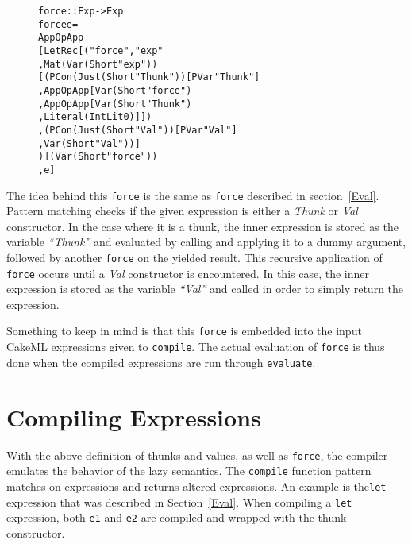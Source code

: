 \begin{figure}[H]
\begin{alltt}
force :: Exp -> Exp
force e =
  App OpApp
    [LetRec [("force", "exp"
            , Mat (Var (Short "exp"))
              [(PCon (Just (Short "Thunk")) [PVar "Thunk"]
               , App OpApp [Var (Short "force")
                           , App OpApp [Var (Short "Thunk")
                                       , Literal (IntLit 0)]])
              ,(PCon (Just (Short "Val")) [PVar "Val"]
               , Var (Short "Val"))]
            )] (Var (Short "force"))
    , e]
\end{alltt}
\end{figure}

\noindent The idea behind this \texttt{force} is the same as \texttt{force} described
in section~\ref{Eval}. Pattern matching checks if the given expression is either
a \textit{Thunk} or \textit{Val} constructor. In the case where it is a thunk,
the inner expression is stored as the variable \textit{``Thunk''} and evaluated
by calling and applying it to a dummy argument, followed by another
\texttt{force} on the yielded result. This recursive application of
\texttt{force} occurs until a \textit{Val} constructor is encountered. In this
case, the inner expression is stored as the variable \textit{``Val''} and called
in order to simply return the expression.

Something to keep in mind is that this \texttt{force} is embedded into the input
CakeML expressions given to \texttt{compile}. The actual evaluation of
\texttt{force} is thus done when the compiled expressions are run through
\texttt{evaluate}.

\section{Compiling Expressions}
With the above definition of thunks and values, as well as \texttt{force}, the
compiler emulates the behavior of the lazy semantics. The \texttt{compile}
function pattern matches on expressions and returns altered expressions.
An example is the\texttt{let} expression that was described in
Section~\ref{Eval}.
When compiling a \texttt{let} expression, both \texttt{e1} and \texttt{e2} are
compiled and wrapped with the thunk constructor.

